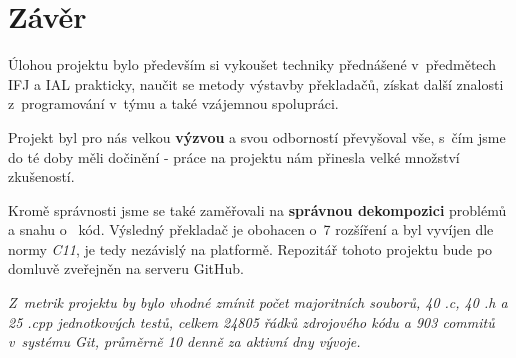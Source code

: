 \section{Závěr}
Úlohou projektu bylo především si vykoušet techniky přednášené v~předmětech IFJ a IAL prakticky,
naučit se metody výstavby překladačů, získat další znalosti z~programování v~týmu a také vzájemnou spolupráci.

Projekt byl pro nás velkou \textbf{výzvou} a svou odborností převyšoval vše, s~čím jsme do té doby měli dočinění - práce na projektu nám přinesla velké množství zkušeností.

Kromě správnosti jsme se také zaměřovali na \textbf{správnou dekompozici} problémů a snahu o~ kód. Výsledný překladač je obohacen o~7 rozšíření a byl vyvíjen dle normy \emph{C11}, je tedy nezávislý na platformě. Repozitář tohoto projektu bude po domluvě zveřejněn na serveru GitHub.

\emph{
	Z~metrik projektu by bylo vhodné zmínit počet majoritních souborů, 40 .c, 40 .h a 25 .cpp jednotkových testů, celkem \emph{24805} řádků zdrojového kódu a \emph{903} commitů v~systému \emph{Git}, průměrně \emph{10} denně za aktivní dny vývoje.
}